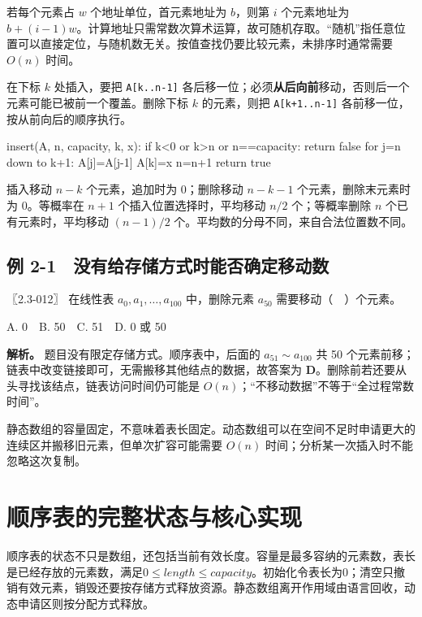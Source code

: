 若每个元素占 \(w\) 个地址单位，首元素地址为 \(b\)，则第 \(i\) 个元素地址为 \(b+(i-1)w\)。计算地址只需常数次算术运算，故可随机存取。``随机''指任意位置可以直接定位，与随机数无关。按值查找仍要比较元素，未排序时通常需要 \(O(n)\) 时间。

在下标 \(k\) 处插入，要把 \texttt{A[k..n-1]} 各后移一位；必须\textbf{从后向前}移动，否则后一个元素可能已被前一个覆盖。删除下标 \(k\) 的元素，则把 \texttt{A[k+\allowbreak{}1..n-1]} 各前移一位，按从前向后的顺序执行。

\begin{codeblock}[language={}]
insert(A, n, capacity, k, x):
    if k<0 or k>n or n==capacity: return false
    for j=n down to k+1: A[j]=A[j-1]
    A[k]=x
    n=n+1
    return true
\end{codeblock}

插入移动 \(n-k\) 个元素，追加时为 0；删除移动 \(n-k-1\) 个元素，删除末元素时为 0。等概率在 \(n+1\) 个插入位置选择时，平均移动 \(n/2\) 个；等概率删除 \(n\) 个已有元素时，平均移动 \((n-1)/2\) 个。平均数的分母不同，来自合法位置数不同。

\subsection{例 2-1　没有给存储方式时能否确定移动数}\label{DS02-ex1}

\begin{example}[配套例题]

〖2.3-012〗 在线性表 \(a_0,a_1,\ldots,a_{100}\) 中，删除元素 \(a_{50}\) 需要移动（　）个元素。

A. 0　B. 50　C. 51　D. 0 或 50

\end{example}

\textbf{解析。} 题目没有限定存储方式。顺序表中，后面的 \(a_{51}\sim a_{100}\) 共 50 个元素前移；链表中改变链接即可，无需搬移其他结点的数据，故答案为 \textbf{D}。删除前若还要从头寻找该结点，链表访问时间仍可能是 \(O(n)\)；``不移动数据''不等于``全过程常数时间''。

静态数组的容量固定，不意味着表长固定。动态数组可以在空间不足时申请更大的连续区并搬移旧元素，但单次扩容可能需要 \(O(n)\) 时间；分析某一次插入时不能忽略这次复制。

\section{顺序表的完整状态与核心实现}\label{DS02-code-seq}

\begin{definition}[表长、容量和初始化]

顺序表的状态不只是数组，还包括当前有效长度。容量是最多容纳的元素数，表长是已经存放的元素数，满足\(0\le length\le capacity\)。初始化令表长为0；清空只撤销有效元素，销毁还要按存储方式释放资源。静态数组离开作用域由语言回收，动态申请区则按分配方式释放。

\end{definition}

